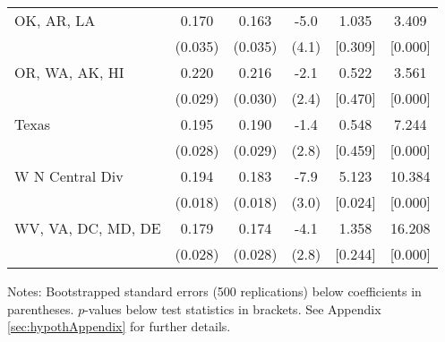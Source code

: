 \begin{landscape}
\begin{table}[ht]
{\begin{threeparttable}
\begin{tabular}{lccccc}
OK, AR, LA & 0.170 & 0.163 & -5.0 & 1.035 & 3.409 \\ 
 & (0.035) & (0.035) & (4.1) & [0.309] & [0.000] \\ 
OR, WA, AK, HI & 0.220 & 0.216 & -2.1 & 0.522 & 3.561 \\ 
 & (0.029) & (0.030) & (2.4) & [0.470] & [0.000] \\ 
Texas & 0.195 & 0.190 & -1.4 & 0.548 & 7.244 \\ 
 & (0.028) & (0.029) & (2.8) & [0.459] & [0.000] \\ 
W N Central Div & 0.194 & 0.183 & -7.9 & 5.123 & 10.384 \\ 
 & (0.018) & (0.018) & (3.0) & [0.024] & [0.000] \\ 
WV, VA, DC, MD, DE & 0.179 & 0.174 & -4.1 & 1.358 & 16.208 \\ 
 & (0.028) & (0.028) & (2.8) & [0.244] & [0.000] \\ 
\bottomrule
\end{tabular}
{\footnotesize {\raggedright Notes: Bootstrapped standard errors (500 replications) below coefficients in parentheses. $p$-values below test statistics in brackets. See Appendix \ref{sec:hypothAppendix} for further details.}}
\end{threeparttable}
}
\end{table}
\end{landscape}
